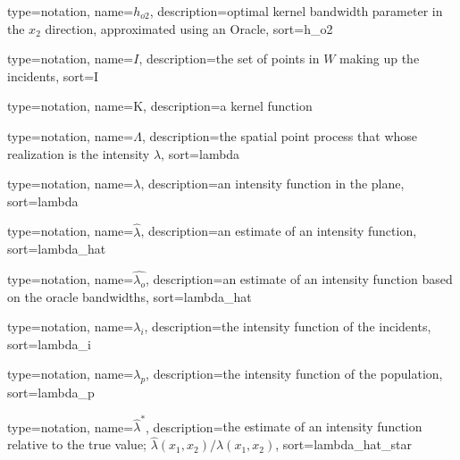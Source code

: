 {%
   type=notation,
   name={\ensuremath{h_{o2}}},
   description={optimal kernel bandwidth parameter in the \ensuremath{x_2} direction, approximated using an Oracle},
   sort={h_o2}
}

{%
   type=notation,
   name={\ensuremath{I}},
   description={the set of points in \ensuremath{W} making up the incidents},
   sort={I}
}

{%
   type=notation,
   name={K},
   description={a kernel function}
}

{%
   type=notation,
   name={\ensuremath{\Lambda}},
   description={the spatial point process that whose realization is the intensity \ensuremath{\lambda}},
   sort={lambda}
}

{%
   type=notation,
   name={\ensuremath{\lambda}},
   description={an intensity function in the plane},
   sort={lambda}
}

{%
   type=notation,
   name={\ensuremath{\hat{\lambda}}},
   description={an estimate of an intensity function},
   sort={lambda_hat}
}

{%
   type=notation,
   name={\ensuremath{\hat{\lambda_o}}},
   description={an estimate of an intensity function based on the oracle bandwidths},
   sort={lambda_hat}
}

{%
   type=notation,
   name={\ensuremath{\lambda_i}},
   description={the intensity function of the incidents},
   sort={lambda_i}
}

{%
   type=notation,
   name={\ensuremath{\lambda_p}},
   description={the intensity function of the population},
   sort={lambda_p}
}

{%
   type=notation,
   name={\ensuremath{\hat{\lambda}^*}},
   description={the estimate of an intensity function relative to the true value; \ensuremath{\hat{\lambda}(x_1, x_2)/\lambda(x_1, x_2)}},
   sort={lambda_hat_star}
}

